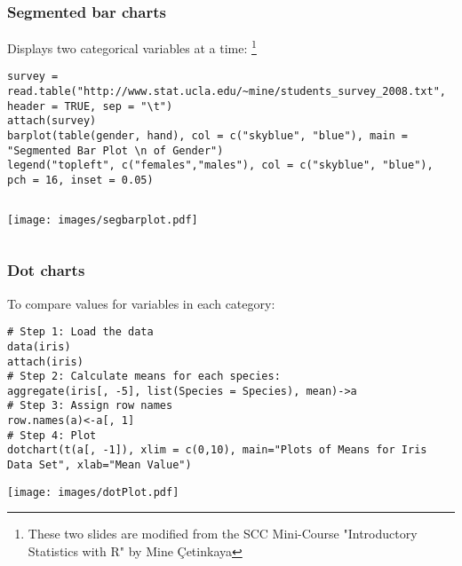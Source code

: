 \begin{frame}
  \frametitle{Segmented bar charts}

Displays two categorical variables at a time: \footnote{These two slides are modified from the SCC Mini-Course "Introductory Statistics with R" by Mine \c{C}etinkaya}

\tiny
\begin{lstlisting}
survey = read.table("http://www.stat.ucla.edu/~mine/students_survey_2008.txt", header = TRUE, sep = "\t")
attach(survey)
barplot(table(gender, hand), col = c("skyblue", "blue"), main = "Segmented Bar Plot \n of Gender")
legend("topleft", c("females","males"), col = c("skyblue", "blue"), pch = 16, inset = 0.05)
\end{lstlisting}

\newpage
    \begin{columns}
      
       \begin{center}
\texttt{[image: images/segbarplot.pdf]}
\end{center}

\begin{center}
\end{center}
\normalsize
\end{columns}

\end{frame}

\begin{frame}
  \frametitle{Dot charts}

To compare values for variables in each category:

\begin{lstlisting}
# Step 1: Load the data
data(iris)
attach(iris)
# Step 2: Calculate means for each species:
aggregate(iris[, -5], list(Species = Species), mean)->a
# Step 3: Assign row names
row.names(a)<-a[, 1]
# Step 4: Plot
dotchart(t(a[, -1]), xlim = c(0,10), main="Plots of Means for Iris Data Set", xlab="Mean Value")
\end{lstlisting}

\newpage
       \begin{center}
		\texttt{[image: images/dotPlot.pdf]}
	\end{center}

\end{frame}

